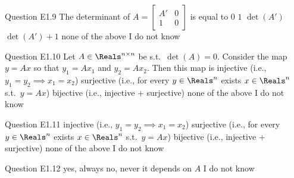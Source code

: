 \begin{frame}{Question E1.9}
	\QuestionBody
	{
		The determinant of 
		$A=\begin{bmatrix} A' & 0 \\ 1 & 0\end{bmatrix}$
		is equal to
	}
	\QuestionAnswers
	{
		\correctanswer $0$
		\answer $1$
		\answer $\det(A')$
		\answer $\det(A')+1$
		\answer none of the above
		\answer I do not know
	}
	\QuestionSolution{}
	\QuestionAuthor{}
	\QuestionVersion{}
\end{frame}


\begin{frame}{Question E1.10}
	\QuestionBody
	{
		Let $A \in \Reals^{n \times n}$ be s.t.\ $\det \left( A \right) = 0$. Consider the map $y = A x$ so that $y_{1} = A x_{1}$ and $y_{2} = A x_{2}$. Then this map is
	}
	\QuestionAnswers
	{
		\answer injective (i.e., $y_1 = y_2 \implies x_1 = x_2$)
		\answer surjective (i.e., for every $y \in \Reals^n$ exists $x \in \Reals^{n}$ s.t.\ $y = Ax$)
		\answer bijective (i.e., injective + surjective)
		\correctanswer none of the above
		\answer I do not know
	}
	\QuestionSolution{}
	\QuestionAuthor{}
	\QuestionVersion{}
\end{frame}


\begin{frame}{Question E1.11}
	\QuestionAnswers
	{
		\answer injective (i.e., $y_{1} = y_{2} \implies x_{1} = x_{2}$)
		\answer surjective (i.e., for every $y \in \Reals^{n}$ exists $x \in \Reals^{n}$ s.t.\ $y = A x$)
		\answer bijective (i.e., injective + surjective)
		\correctanswer none of the above
		\answer I do not know
	}
	\QuestionSolution{}
	\QuestionAuthor{}
	\QuestionVersion{}
\end{frame}


\begin{frame}{Question E1.12}
	\QuestionAnswers
	{
		\answer yes, always
		\answer no, never
		\correctanswer it depends on $A$
		\answer I do not know
	}
	\QuestionSolution{}
	\QuestionAuthor{}
	\QuestionVersion{}
\end{frame}


